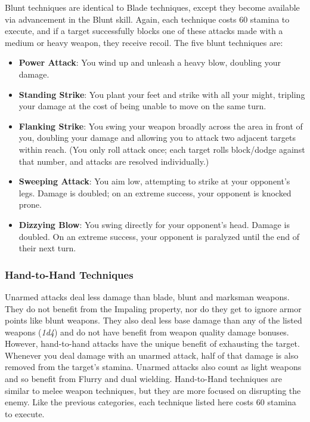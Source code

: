 Blunt techniques are identical to Blade techniques, except they become available via advancement in the Blunt skill. Again, each technique costs 60 stamina to execute, and if a target successfully blocks one of these attacks made with a medium or heavy weapon, they receive recoil. The five blunt techniques are:

\begin{itemize}
	\item \textbf{Power Attack}: You wind up and unleash a heavy blow, doubling your damage.
	\item \textbf{Standing Strike}: You plant your feet and strike with all your might, tripling your damage at the cost of being unable to move on the same turn.
	\item \textbf{Flanking Strike}: You swing your weapon broadly across the area in front of you, doubling your damage and allowing you to attack two adjacent targets within reach. (You only roll attack once; each target rolls block/dodge against that number, and attacks are resolved individually.)
	\item \textbf{Sweeping Attack}: You aim low, attempting to strike at your opponent's legs. Damage is doubled; on an extreme success, your opponent is knocked prone.
	\item \textbf{Dizzying Blow}: You swing directly for your opponent's head. Damage is doubled. On an extreme success, your opponent is paralyzed until the end of their next turn.
\end{itemize}

\subsubsection{Hand-to-Hand Techniques}

Unarmed attacks deal less damage than blade, blunt and marksman weapons. They do not benefit from the Impaling property, nor do they get to ignore armor points like blunt weapons. They also deal less base damage than any of the listed weapons (\textit{1d4}) and do not have benefit from weapon quality damage bonuses. However, hand-to-hand attacks have the unique benefit of exhausting the target. Whenever you deal damage with an unarmed attack, half of that damage is also removed from the target's stamina. Unarmed attacks also count as light weapons and so benefit from Flurry and dual wielding. Hand-to-Hand techniques are similar to melee weapon techniques, but they are more focused on disrupting the enemy. Like the previous categories, each technique listed here costs 60 stamina to execute.

